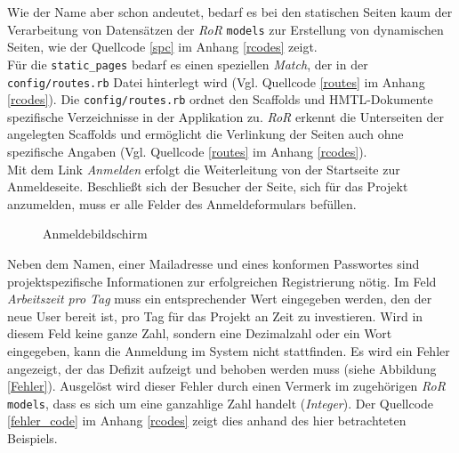 \documentclass[a4paper,12pt,parskip,bibtotoc,liststotoc]{article}
\begin{document}
Wie der Name aber schon andeutet, bedarf es bei den statischen Seiten kaum der Verarbeitung von Datensätzen der \textit{RoR} \texttt{models} zur Erstellung von dynamischen Seiten, wie der Quellcode \ref{spc} im Anhang \ref{rcodes} zeigt.\\

Für die \texttt{static\_pages} bedarf es einen speziellen \textit{Match}, der in der \texttt{config/routes.rb} Datei hinterlegt wird (Vgl. Quellcode \ref{routes} im Anhang \ref{rcodes}). Die \texttt{config/routes.rb} ordnet den Scaffolds und HMTL-Dokumente spezifische Verzeichnisse in der Applikation zu. \textit{RoR} erkennt die Unterseiten der angelegten Scaffolds und ermöglicht die Verlinkung der Seiten auch ohne spezifische Angaben (Vgl. Quellcode \ref{routes} im Anhang \ref{rcodes}).\\

Mit dem Link \textit{Anmelden} erfolgt die Weiterleitung von der Startseite zur Anmeldeseite. Beschließt sich der Besucher der Seite, sich für das Projekt anzumelden, muss er alle Felder des Anmeldeformulars befüllen.

\begin{figure}[h!]
  \begin{center}
    \caption{Anmeldebildschirm}  \label{Anm}
  \end{center}
\end{figure}

Neben dem Namen, einer Mailadresse und eines konformen Passwortes sind projektspezifische Informationen zur erfolgreichen Registrierung nötig. Im Feld \textit{Arbeitszeit pro Tag} muss ein entsprechender Wert eingegeben werden, den der neue User bereit ist, pro Tag für das Projekt an Zeit zu investieren. Wird in diesem Feld keine ganze Zahl, sondern eine Dezimalzahl oder ein Wort eingegeben, kann die Anmeldung im System nicht stattfinden. Es wird ein Fehler angezeigt, der das Defizit aufzeigt und behoben werden muss (siehe Abbildung \ref{Fehler}). Ausgelöst wird dieser Fehler durch einen Vermerk im zugehörigen \textit{RoR} \texttt{models}, dass es sich um eine ganzahlige Zahl handelt (\textit{Integer}). Der Quellcode \ref{fehler_code} im Anhang \ref{rcodes} zeigt dies anhand des hier betrachteten Beispiels.\\
\end{document}
